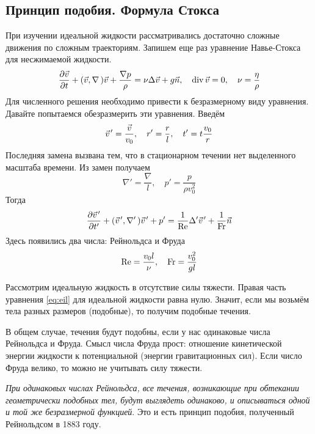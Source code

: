 \subsection{Принцип подобия. Формула Стокса}
При изучении идеальной жидкости рассматривались достаточно сложные движения по сложным траекториям.%
Запишем еще раз уравнение Навье-Стокса для несжимаемой жидкости.
\begin{equation}
	\label{eq:eil}
    \pdv{\vec{v}}{t}+(\vec{v},\nabla\,)\vec{v}+\frac{\nabla p}{\rho}=
    \nu \Delta \vec{v} + g \vec{n}, \quad
    \operatorname{div} \vec{v} = 0, \quad \nu=\frac{\eta}{\rho}
\end{equation}
Для численного решения необходимо привести к безразмерному виду уравнения. Давайте попытаемся обезразмерить эти уравнения. Введём
\begin{equation}
    \pvec{v}' = \frac{\vec{v}}{v_0}, \quad
    r' = \frac{r}{l}, \quad
    t' = t \frac{v_0}{r}
\end{equation}
Последняя замена вызвана тем, что в стационарном течении нет выделенного масштаба времени.
Из замен получаем
\begin{equation}
    \nabla' = \frac{\nabla}{l},\quad
    p'=\frac{p}{\rho v_0^2}
\end{equation}
Тогда
\begin{equation}
    \pdv{\pvec{v}'}{t'}+(\pvec{v}', \nabla'\,)\pvec{v}' + p'=
    \frac{1}{\Re}\Delta' \pvec{v}' + \frac{1}{\Fr} \vec{n}
\end{equation}
Здесь появились два числа: Рейнольдса и Фруда
\begin{equation}
    \Re=\frac{v_0 l}{\nu}, \quad
    \operatorname{Fr}=\frac{v_0^2}{gl}
\end{equation}

Рассмотрим идеальную жидкость в отсутствие силы тяжести. Правая часть уравнения \eqref{eq:eil} для идеальной жидкости равна нулю. Значит, если мы возьмём тела разных размеров (подобные), то получим подобные течения.

В общем случае, течения будут подобны, если у нас одинаковые числа Рейнольдса и Фруда. Смысл числа Фруда прост: отношение кинетической энергии жидкости к потенциальной (энергии гравитационных сил). Если число Фруда велико, то можно не учитывать силу тяжести.

\textit{При одинаковых числах Рейнольдса, все течения, возникающие при обтекании геометрически подобных тел, будут выглядеть одинаково, и описываться одной и той же безразмерной функцией}. Это и есть принцип подобия, полученный Рейнольдсом в 1883 году.

